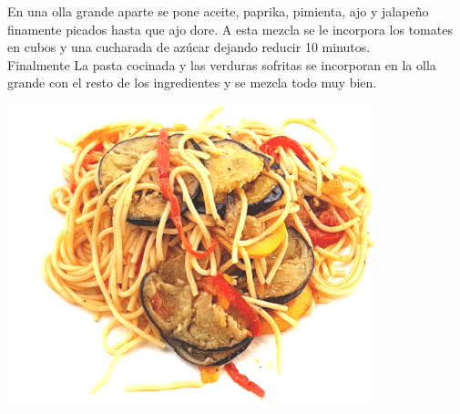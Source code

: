 En una olla grande aparte se pone aceite, paprika, pimienta, ajo y jalapeño finamente picados hasta que ajo dore. A esta mezcla se le incorpora los tomates en cubos y una cucharada de azúcar dejando reducir 10 minutos.\\

Finalmente La pasta cocinada y las verduras sofritas se incorporan en la olla grande con el resto de los ingredientes y se mezcla todo muy bien.

\vspace*{2cm}
\begin{center}
\includegraphics[width=0.8\textwidth]{fotos/spaguetti_veduras.png}
\end{center}
